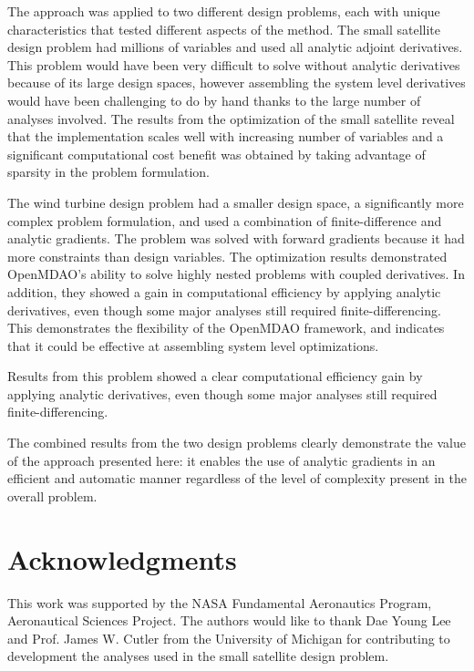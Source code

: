 \documentclass[]{aiaa-tc} %
\begin{document}
      The approach was applied to two different design problems, each with unique characteristics that 
      tested different aspects of the method. The small satellite design problem had millions of variables and used all analytic adjoint derivatives.
      This problem would have been very difficult to solve without analytic derivatives because of its large design spaces, however assembling the 
      system level derivatives would have been challenging to do by hand thanks to the large number of analyses involved. 
      The results from the optimization of the small satellite reveal that the implementation scales well with increasing 
      number of variables and a significant computational cost benefit was obtained by taking advantage of 
      sparsity in the problem formulation. 

      The wind turbine design problem had a smaller design space, a significantly more complex problem formulation, and used a 
      combination of finite-difference and analytic gradients. The problem was solved with forward gradients because 
      it had more constraints than design variables. The optimization results demonstrated OpenMDAO's ability
      to solve highly nested problems with coupled derivatives. In addition, they showed a gain in computational efficiency 
      by applying analytic derivatives, even though some major analyses still required finite-differencing. This demonstrates the 
      flexibility of the OpenMDAO framework, and indicates that it could be effective at assembling system level optimizations. 

      Results from this problem showed a clear computational efficiency gain by applying
      analytic derivatives, even though some major analyses still required finite-differencing.

      The combined results from the two design problems clearly demonstrate the value of the approach presented here: it enables 
      the use of analytic gradients in an efficient and automatic manner regardless of the level of complexity present in the overall 
      problem. 


  \section{Acknowledgments}

      This work was supported by the NASA Fundamental Aeronautics Program, Aeronautical Sciences Project. 
      The authors would like to thank Dae Young Lee and Prof. James W. Cutler from the University of Michigan 
      for contributing to development the analyses used in the small satellite design problem. 

  
\end{document}
